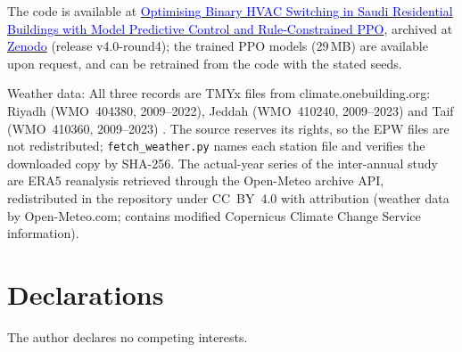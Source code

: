 \documentclass[pdflatex,sn-mathphys-num,iicol]{sn-jnl}
\theoremstyle{thmstyleone}\newtheorem{proposition}{Proposition}\newtheorem{corollary}{Corollary}
\theoremstyle{thmstyletwo}\newtheorem{remark}{Remark}\newtheorem{observation}{Observation}
\theoremstyle{thmstylethree}\newtheorem{definition}{Definition}
\begin{document}
The code is available at \href{https://github.com/drhamzahfaraj/Hybrid-Rule-Constrained-PPO-for-Cost-Effective-Binary-HVAC-Scheduling-in-Saudi-Residential-Buildings}{\textcolor{blue}{Optimising Binary HVAC Switching in Saudi Residential Buildings with Model Predictive Control and Rule-Constrained PPO}}, archived at \href{https://doi.org/10.5281/zenodo.24199676}{\textcolor{blue}{Zenodo}} (release v4.0-round4); the trained PPO models ($29\,$MB) are available upon request, and can be retrained from the code with the stated seeds.

Weather data: All three records are TMYx files from climate.onebuilding.org: Riyadh (WMO~404380, 2009--2022), Jeddah (WMO~410240, 2009--2023) and Taif (WMO~410360, 2009--2023) \citep{EPW2023}. The source reserves its rights, so the EPW files are not redistributed; \texttt{fetch\_weather.py} names each station file and verifies the downloaded copy by SHA-256. The actual-year series of the inter-annual study are ERA5 reanalysis \citep{Hersbach2020} retrieved through the Open-Meteo archive API, redistributed in the repository under CC~BY~4.0 with attribution (weather data by Open-Meteo.com; contains modified Copernicus Climate Change Service information).

\section*{Declarations}

The author declares no competing interests.


\end{document}
